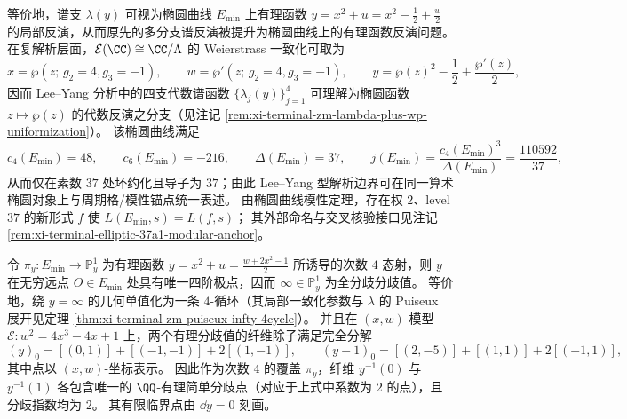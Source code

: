 \begin{theorem}
等价地，谱支 \(\lambda(y)\) 可视为椭圆曲线 \(E_{\min}\) 上有理函数 \(y=x^2+u=x^2-\tfrac12+\tfrac{w}{2}\) 的局部反演，从而原先的多分支谱反演被提升为椭圆曲线上的有理函数反演问题。
在复解析层面，\(\mathcal E(\CC)\cong \CC/\Lambda\) 的 Weierstrass 一致化可取为
\[
x=\wp(z;\,g_2=4,g_3=-1),\qquad w=\wp'(z;\,g_2=4,g_3=-1),\qquad
y=\wp(z)^2-\frac12+\frac{\wp'(z)}{2},
\]
因而 Lee--Yang 分析中的四支代数谱函数 \(\{\lambda_j(y)\}_{j=1}^{4}\) 可理解为椭圆函数 \(z\mapsto\wp(z)\) 的代数反演之分支（见注记 \ref{rem:xi-terminal-zm-lambda-plus-wp-uniformization}）。
该椭圆曲线满足
\[
c_4(E_{\min})=48,\qquad c_6(E_{\min})=-216,\qquad
\Delta(E_{\min})=37,\qquad j(E_{\min})=\frac{c_4(E_{\min})^{3}}{\Delta(E_{\min})}=\frac{110592}{37},
\]
从而仅在素数 \(37\) 处坏约化且导子为 \(37\)；由此 Lee--Yang 型解析边界可在同一算术椭圆对象上与周期格/模性锚点统一表述。
由椭圆曲线模性定理，存在权 \(2\)、level \(37\) 的新形式 \(f\) 使 \(L(E_{\min},s)=L(f,s)\)；
其外部命名与交叉核验接口见注记 \ref{rem:xi-terminal-elliptic-37a1-modular-anchor}。
\par
令 \(\pi_y:E_{\min}\to\mathbb P^1_y\) 为有理函数
\(
y=x^2+u=\frac{w+2x^2-1}{2}
\)
所诱导的次数 \(4\) 态射，则 \(y\) 在无穷远点 \(O\in E_{\min}\) 处具有唯一四阶极点，因而 \(\infty\in\mathbb P^1_y\) 为全分歧分歧值。
等价地，绕 \(y=\infty\) 的几何单值化为一条 \(4\)-循环（其局部一致化参数与 \(\lambda\) 的 Puiseux 展开见定理 \ref{thm:xi-terminal-zm-puiseux-infty-4cycle}）。
并且在 \((x,w)\)-模型 \(\mathcal E:w^2=4x^3-4x+1\) 上，两个有理分歧值的纤维除子满足完全分解
\[
(y)_0=[(0,1)]+[(-1,-1)]+2[(1,-1)],
\qquad
(y-1)_0=[(2,-5)]+[(1,1)]+2[(-1,1)],
\]
其中点以 \((x,w)\)-坐标表示。
因此作为次数 \(4\) 的覆盖 \(\pi_y\)，纤维 \(y^{-1}(0)\) 与 \(y^{-1}(1)\) 各包含唯一的 \(\QQ\)-有理简单分歧点（对应于上式中系数为 \(2\) 的点），且分歧指数均为 \(2\)。
其有限临界点由 \(\dd y=0\) 刻画。


\end{theorem}
